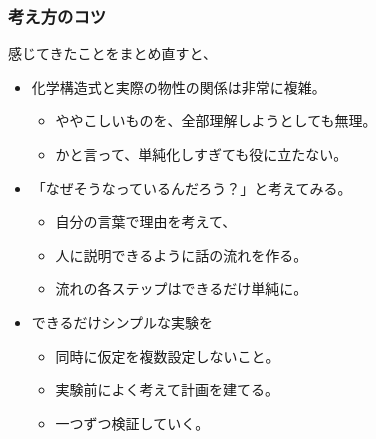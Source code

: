 \documentclass[unicode,12pt]{beamer}%
\begin{document}
\begin{frame}
	\frametitle{考え方のコツ}
		\begin{block}{感じてきたことをまとめ直すと、}
			\begin{itemize}
				\item 化学構造式と実際の物性の関係は非常に複雑。
				\begin{itemize}
					\item ややこしいものを、全部理解しようとしても無理。
					\item かと言って、単純化しすぎても役に立たない。
				\end{itemize}
				\item 「なぜそうなっているんだろう？」と考えてみる。
				\begin{itemize}
					\item 自分の言葉で理由を考えて、
					\item 人に説明できるように話の流れを作る。
					\item 流れの各ステップはできるだけ単純に。
				\end{itemize}
				\item できるだけシンプルな実験を
				\begin{itemize}
					\item 同時に仮定を複数設定しないこと。
					\item 実験前によく考えて計画を建てる。
					\item 一つずつ検証していく。
				\end{itemize}
			\end{itemize}
		\end{block}
\end{frame}
\end{document}
